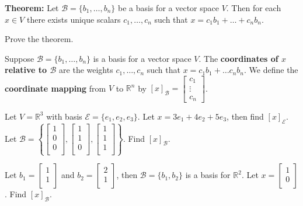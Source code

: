 \newpage

{\bf Theorem:} Let $\mathcal{B} =\{b_1, \dots, b_n\}$ be a basis for a  vector space $V$. Then for each $x \in V$ there exists unique scalars $c_1,\dots, c_n$ such that $x=c_1 b_1+\dots+ c_n b_n$.



\begin{enumerate}


\Problem Prove the theorem.

\vfill

\begin{defn} Suppose $\mathcal{B}=\{b_1, \dots, b_n\}$ is a basis for a vector space $V$. The {\bf coordinates of $x$ relative to $\mathcal{B}$} are the weights $c_1, \dots, c_n$ such that $x=c_1 b_1 +\dots c_n b_n$. We define the {\bf coordinate mapping} from $V$ to $\mathbb{R}^n$ by $[x]_\mathcal{B}=\begin{bmatrix} c_1\\ \vdots\\ c_n \end{bmatrix}$.
\end{defn}

\Problem Let $V=\mathbb{R}^3$ with basis $\mathcal{E}=\{e_1, e_2, e_3\}$. Let $x= 3e_1 +4e_2+5e_3$, then find $[x]_\mathcal{E}$. Let $\mathcal{B}=\left\{\begin{bmatrix} 1\\ 0\\ 0\\\end{bmatrix},\begin{bmatrix} 1\\ 1\\ 0\\\end{bmatrix},\begin{bmatrix} 1\\ 1\\ 1\\\end{bmatrix} \right\}.$ Find $[x]_\mathcal{B}$.

\vfill

\newpage

\Problem Let $b_1=\begin{bmatrix} 1\\ 1\\ \end{bmatrix}$ and $b_2=\begin{bmatrix} 2\\ 1\\ \end{bmatrix}$, then $\mathcal{B}=\{b_1, b_2\}$ is a basis for $\mathbb{R}^2$. Let $x =\begin{bmatrix} 1\\ 0\\ \end{bmatrix}$. Find $[x]_\mathcal{B}$.


\end{enumerate}
